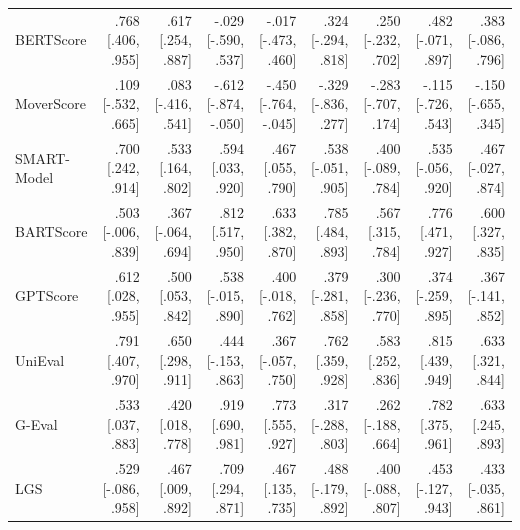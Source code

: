 \begin{table}[t]
\begin{tabular}{lrrrrrrrr}
BERTScore & .768 {\scriptsize [.406, .955]} & .617 {\scriptsize [.254, .887]} & -.029 {\scriptsize [-.590, .537]} & -.017 {\scriptsize [-.473, .460]} & .324 {\scriptsize [-.294, .818]} & .250 {\scriptsize [-.232, .702]} & .482 {\scriptsize [-.071, .897]} & .383 {\scriptsize [-.086, .796]} \\
MoverScore & .109 {\scriptsize [-.532, .665]} & .083 {\scriptsize [-.416, .541]} & -.612 {\scriptsize [-.874, -.050]} & -.450 {\scriptsize [-.764, -.045]} & -.329 {\scriptsize [-.836, .277]} & -.283 {\scriptsize [-.707, .174]} & -.115 {\scriptsize [-.726, .543]} & -.150 {\scriptsize [-.655, .345]} \\
SMART-Model & .700 {\scriptsize [.242, .914]} & .533 {\scriptsize [.164, .802]} & .594 {\scriptsize [.033, .920]} & .467 {\scriptsize [.055, .790]} & .538 {\scriptsize [-.051, .905]} & .400 {\scriptsize [-.089, .784]} & .535 {\scriptsize [-.056, .920]} & .467 {\scriptsize [-.027, .874]} \\
BARTScore & .503 {\scriptsize [-.006, .839]} & .367 {\scriptsize [-.064, .694]} & .812 {\scriptsize [.517, .950]} & .633 {\scriptsize [.382, .870]} & .785 {\scriptsize [.484, .893]} & .567 {\scriptsize [.315, .784]} & .776 {\scriptsize [.471, .927]} & .600 {\scriptsize [.327, .835]} \\
GPTScore & .612 {\scriptsize [.028, .955]} & .500 {\scriptsize [.053, .842]} & .538 {\scriptsize [-.015, .890]} & .400 {\scriptsize [-.018, .762]} & .379 {\scriptsize [-.281, .858]} & .300 {\scriptsize [-.236, .770]} & .374 {\scriptsize [-.259, .895]} & .367 {\scriptsize [-.141, .852]} \\
UniEval & .791 {\scriptsize [.407, .970]} & .650 {\scriptsize [.298, .911]} & .444 {\scriptsize [-.153, .863]} & .367 {\scriptsize [-.057, .750]} & .762 {\scriptsize [.359, .928]} & .583 {\scriptsize [.252, .836]} & .815 {\scriptsize [.439, .949]} & .633 {\scriptsize [.321, .844]} \\
G-Eval & .533 {\scriptsize [.037, .883]} & .420 {\scriptsize [.018, .778]} & .919 {\scriptsize [.690, .981]} & .773 {\scriptsize [.555, .927]} & .317 {\scriptsize [-.288, .803]} & .262 {\scriptsize [-.188, .664]} & .782 {\scriptsize [.375, .961]} & .633 {\scriptsize [.245, .893]} \\
LGS & .529 {\scriptsize [-.086, .958]} & .467 {\scriptsize [.009, .892]} & .709 {\scriptsize [.294, .871]} & .467 {\scriptsize [.135, .735]} & .488 {\scriptsize [-.179, .892]} & .400 {\scriptsize [-.088, .807]} & .453 {\scriptsize [-.127, .943]} & .433 {\scriptsize [-.035, .861]} \\
\bottomrule
\end{tabular}
\end{table}
